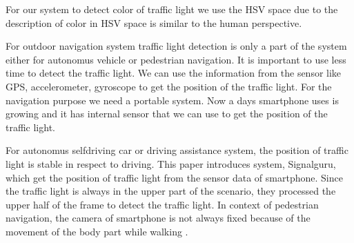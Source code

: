 For our system to detect color of traffic light we use the HSV space due to the description of color in HSV space is similar to the human perspective.

For outdoor navigation system traffic light detection is only a part of the system either for autonomus vehicle or pedestrian navigation.
It is important to use less time to detect the traffic light.
We can use the information from the sensor like GPS, accelerometer, gyroscope to get the position of the traffic light. \cite{sensor,sensor2,sensor3}
For the navigation purpose we need a portable system.
Now a days smartphone uses is growing and it has internal sensor that we can use to get the position of the traffic light.

For autonomus selfdriving car or driving assistance system, the position of traffic light is stable in respect to driving.\cite{signalguru}
This paper introduces system, Signalguru, which get the position of traffic light from the sensor data of smartphone.
Since the traffic light is always in the upper part of the scenario, they processed the upper half of the frame to detect the traffic light.
In context of pedestrian navigation, the camera of smartphone is not always fixed because of the movement of the body part while walking \cite{sensor_pedestrian,sensor_pedestrian2}.



